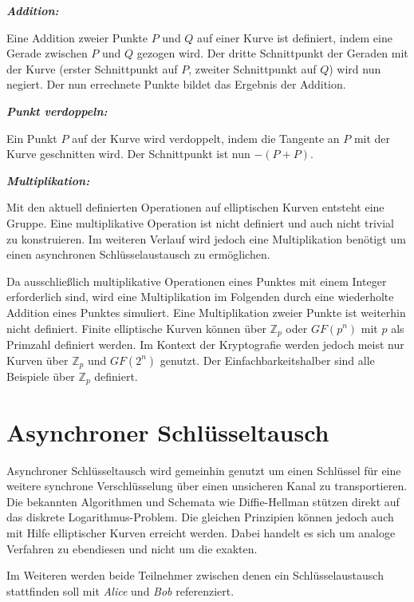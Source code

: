 \textit{\textbf{Addition:}}

Eine Addition zweier Punkte $P$ und $Q$ auf einer Kurve ist definiert, indem eine Gerade zwischen $P$ und $Q$ 
gezogen wird. Der dritte Schnittpunkt der Geraden mit der Kurve (erster Schnittpunkt auf $P$, zweiter 
Schnittpunkt auf $Q$) wird nun negiert. Der nun errechnete Punkte bildet das Ergebnis der Addition.

\textit{\textbf{Punkt verdoppeln:}}

Ein Punkt $P$ auf der Kurve wird verdoppelt, indem die Tangente an $P$ mit der Kurve geschnitten wird. Der Schnittpunkt
ist nun $-(P+P)$.

\textit{\textbf{Multiplikation:}}

Mit den aktuell definierten Operationen auf elliptischen Kurven entsteht eine Gruppe. 
Eine multiplikative Operation ist nicht definiert und auch nicht trivial zu konstruieren.
Im weiteren Verlauf wird jedoch eine Multiplikation benötigt um einen asynchronen Schlüsselaustausch zu ermöglichen.

Da ausschließlich multiplikative Operationen eines Punktes mit einem Integer erforderlich sind, wird 
eine Multiplikation im Folgenden durch eine wiederholte Addition eines Punktes simuliert.
Eine Multiplikation zweier Punkte ist weiterhin nicht definiert.
\newline
\newline
Finite elliptische Kurven können über $\mathbb{Z}_p$ oder $GF(p^n)$ mit $p$ als Primzahl definiert werden.
Im Kontext der Kryptografie werden jedoch meist nur Kurven über $\mathbb{Z}_p$ und $GF(2^n)$ genutzt.
Der Einfachbarkeitshalber sind alle Beispiele über $\mathbb{Z}_p$ definiert.

\newpage

\section{Asynchroner Schlüsseltausch}

Asynchroner Schlüsseltausch wird gemeinhin genutzt um einen Schlüssel für eine weitere synchrone Verschlüsselung über 
einen unsicheren Kanal zu transportieren. Die bekannten Algorithmen und Schemata wie Diffie-Hellman stützen direkt auf
das diskrete Logarithmus-Problem. Die gleichen Prinzipien können jedoch auch mit Hilfe elliptischer Kurven erreicht 
werden. Dabei handelt es sich um analoge Verfahren zu ebendiesen und nicht um die exakten.

Im Weiteren werden beide Teilnehmer zwischen denen ein Schlüsselaustausch stattfinden soll mit \textit{Alice} und \textit{Bob}
referenziert.

